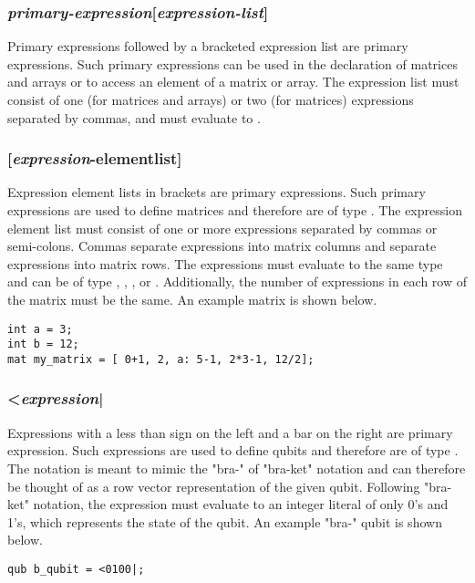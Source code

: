 \subsubsection{\textit{primary-expression}[\textit{expression-list}]}
Primary expressions followed by a bracketed expression list are primary expressions. Such primary expressions can be used in the declaration of matrices and arrays or to access an element of a matrix or array. The expression list must consist of one (for matrices and arrays) or two (for matrices) expressions separated by commas, and must evaluate to \integ.

\subsubsection{[\textit{expression}-elementlist]}
Expression element lists in brackets are primary expressions. Such primary expressions are used to define matrices and therefore are of type \mat. The expression element list must consist of one or more expressions separated by commas or semi-colons. Commas separate expressions into matrix columns and  separate expressions into matrix rows. The expressions must evaluate to the same type and can be of type \integ, \float, \complex, or \mat. Additionally, the number of expressions in each row of the matrix must be the same. An example matrix is shown below.

\begin{lstlisting}
int a = 3;
int b = 12;
mat my_matrix = [ 0+1, 2, a: 5-1, 2*3-1, 12/2];
\end{lstlisting}

\subsubsection{<\textit{expression}|}
Expressions with a less than sign on the left and a bar on the right are primary expression. Such expressions are used to define qubits and therefore are of type \qubit. The notation is meant to mimic the "bra-" of "bra-ket" notation and can therefore be thought of as a row vector representation of the given qubit. Following "bra-ket" notation, the expression must evaluate  to an integer literal of only 0's and 1's, which represents the state of the qubit. An example "bra-" qubit is shown below.

\begin{lstlisting}
qub b_qubit = <0100|;
\end{lstlisting}


